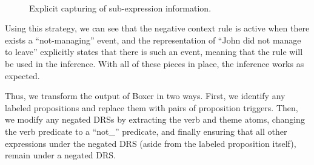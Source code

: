 \begin{figure}
  \centering
  ~~~~~~~~~
  \caption{Explicit capturing of sub-expression information.}
  \label{drs:impl-3}
\end{figure}

Using this strategy, we can see that the negative context rule is active when
there exists a ``not-managing'' event, and the representation of ``John did
not manage to leave'' explicitly states that there is such an event, meaning
that the rule will be used in the inference.  With all of these pieces in place,
the inference works as expected.

Thus, we transform the output of Boxer in two ways.  First, we identify any
labeled propositions and replace them with pairs of proposition triggers.  Then,
we modify any negated DRSs by extracting the verb and theme atoms, changing the
verb predicate to a ``not\_'' predicate, and finally ensuring that all other
expressions under the negated DRS (aside from the labeled proposition itself),
remain under a negated DRS.

